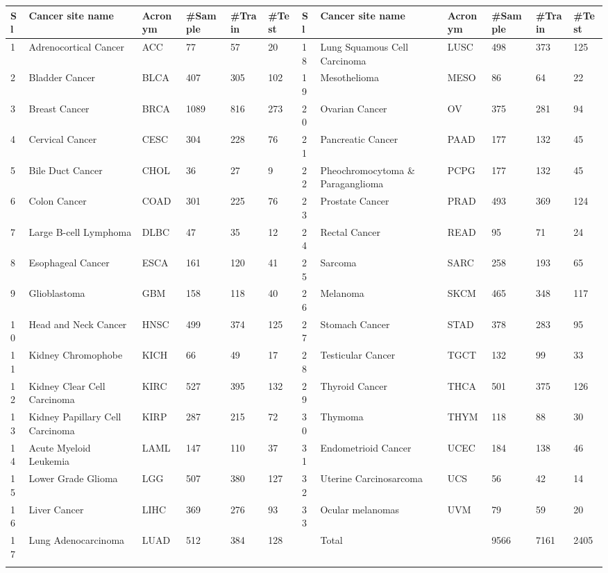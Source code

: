 \documentclass{bioinfo}
\begin{document}
\begin{table}[hbt]
 {\begin{tabular}{@{}llllll|llllll@{}}\toprule Sl	&	Cancer site name	&	Acronym	&	\#Sample	&	\#Train	&	\#Test	&	Sl	&	Cancer site name	&	Acronym	&	\#Sample	&	\#Train	&	\#Test\\\midrule

1	&	Adrenocortical Cancer	&	ACC	&	77	&	57	&	20	&	18	&	Lung Squamous Cell Carcinoma	&	LUSC	&	498	&	373	&	125	\\
2	&	Bladder Cancer	&	BLCA	&	407	&	305	&	102	&	19	&	Mesothelioma	&	MESO	&	86	&	64	&	22	\\
3	&	Breast Cancer	&	BRCA	&	1089	&	816	&	273	&	20	&	Ovarian Cancer	&	OV	&	375	&	281	&	94	\\
4	&	Cervical Cancer	&	CESC	&	304	&	228	&	76	&	21	&	Pancreatic Cancer	&	PAAD	&	177	&	132	&	45	\\
5	&	Bile Duct Cancer	&	CHOL	&	36	&	27	&	9	&	22	&	Pheochromocytoma \& Paraganglioma	&	PCPG	&	177	&	132	&	45	\\
6	&	Colon Cancer	&	COAD	&	301	&	225	&	76	&	23	&	Prostate Cancer	&	PRAD	&	493	&	369	&	124	\\
7	&	Large B-cell Lymphoma	&	DLBC	&	47	&	35	&	12	&	24	&	Rectal Cancer	&	READ	&	95	&	71	&	24	\\
8	&	Esophageal Cancer	&	ESCA	&	161	&	120	&	41	&	25	&	Sarcoma	&	SARC	&	258	&	193	&	65	\\
9	&	Glioblastoma	&	GBM	&	158	&	118	&	40	&	26	&	Melanoma	&	SKCM	&	465	&	348	&	117	\\
10	&	Head and Neck Cancer	&	HNSC	&	499	&	374	&	125	&	27	&	Stomach Cancer	&	STAD	&	378	&	283	&	95	\\
11	&	Kidney Chromophobe	&	KICH	&	66	&	49	&	17	&	28	&	Testicular Cancer	&	TGCT	&	132	&	99	&	33	\\
12	&	Kidney Clear Cell Carcinoma	&	KIRC	&	527	&	395	&	132	&	29	&	Thyroid Cancer	&	THCA	&	501	&	375	&	126	\\
13	&	Kidney Papillary Cell Carcinoma	&	KIRP	&	287	&	215	&	72	&	30	&	Thymoma	&	THYM	&	118	&	88	&	30	\\
14	&	Acute Myeloid Leukemia	&	LAML	&	147	&	110	&	37	&	31	&	Endometrioid Cancer	&	UCEC	&	184	&	138	&	46	\\
15	&	Lower Grade Glioma	&	LGG	&	507	&	380	&	127	&	32	&	Uterine Carcinosarcoma	&	UCS	&	56	&	42	&	14	\\
16	&	Liver Cancer	&	LIHC	&	369	&	276	&	93	&	33	&	Ocular melanomas	&	UVM	&	79	&	59	&	20	\\
17	&	Lung Adenocarcinoma	&	LUAD	&	512	&	384	&	128	&		&	Total	&		&	9566	&	7161	&	2405\\\botrule
\end{tabular}}{}
\end{table}
\end{document}

